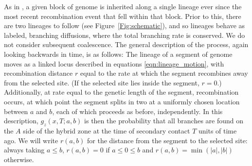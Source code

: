 \documentclass[11pt,letterpaper]{article}
\begin{document}
As in \citet{sedghifar2015spatial}, 
a given block of genome is inherited along a single lineage ever since the most recent recombination event
that fell within that block.
Prior to this, there are two lineages to follow (see Figure~\ref{Fig:schematic}),
and so lineages behave as labeled, branching diffusions,
where the total branching rate is conserved. 
We do not consider subsequent coalescence.
The general description of the process, again looking backwards in time, is as follows:
The lineage of a segment of genome moves as a linked locus described in equations \eqref{eqn:lineage_motion},
with recombination distance $r$ equal to the rate at which the segment recombines away from the selected site.
(If the selected site lies inside the segment, $r=0$.)
Additionally, at rate equal to the genetic length of the segment,
recombination occurs, at which point the segment splits in two at a uniformly chosen location between $a$ and $b$,
each of which proceeds as before, independently. 
In this description,
$g_z(x,T;a,b)$ is then the probability that all branches are found on the $A$ side of the hybrid zone
at the time of secondary contact $T$ units of time ago.
We will write $r(a,b)$ for the distance from the segment to the selected site:
always taking $a \le b$,
$r(a,b)=0$ if $a \le 0 \le b$ and $r(a,b)=\min(|a|,|b|)$ otherwise.
\end{document}
